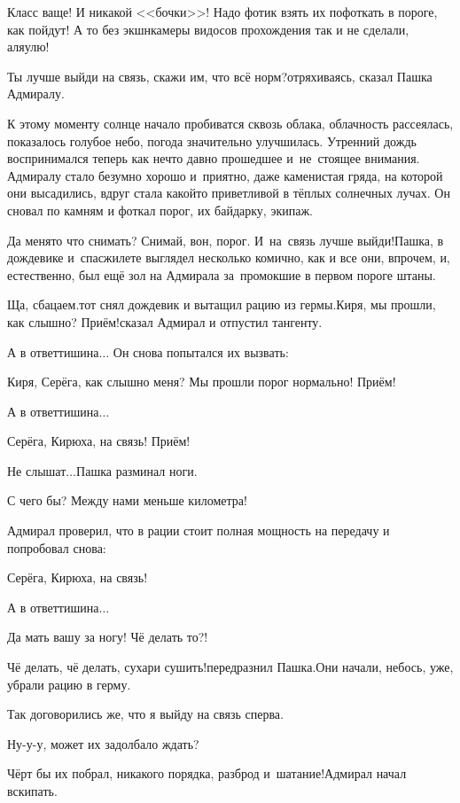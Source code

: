\diagdash Класс ваще! И никакой <<бочки>>! Надо фотик взять их пофоткать в пороге, как пойдут! А то без экшн\sdash камеры видосов прохождения так и не сделали, аля\sdash улю!

\diagdash Ты лучше выйди на связь, скажи им, что всё норм?\mdash отряхиваясь, сказал Пашка Адмиралу.

К этому моменту солнце начало пробиватся сквозь облака, облачность рассеялась, показалось голубое небо, погода значительно улучшилась. Утренний дождь воспринимался теперь как нечто давно прошедшее и~не~стоящее внимания. Адмиралу стало безумно хорошо и~приятно, даже каменистая гряда, на которой они высадились, вдруг стала какой\sdash то приветливой в тёплых солнечных лучах. Он сновал по камням и фоткал порог, их байдарку, экипаж.

\diagdash Да меня\sdash то что снимать? Снимай, вон, порог. И~на~связь лучше выйди!\mdash Пашка, в дождевике и~спасжилете выглядел несколько комично, как и все они, впрочем, и, естественно, был ещё зол на Адмирала за~промокшие в первом пороге штаны. 

\diagdash Ща, сбацаем.\mdash тот снял дождевик и вытащил рацию из гермы.\mdash Киря, мы прошли, как слышно? Приём!\mdash сказал Адмирал и отпустил тангенту.

А в ответ\mdash тишина$\ldots$ Он снова попытался их вызвать:

\diagdash Киря, Серёга, как слышно меня? Мы прошли порог нормально! Приём!

А в ответ\mdash тишина$\ldots$

\diagdash Серёга, Кирюха, на связь! Приём!

\diagdash Не слышат$\ldots$\mdash Пашка разминал ноги.

\diagdash С чего бы? Между нами меньше километра!

Адмирал проверил, что в рации стоит полная мощность на передачу и попробовал снова:

\diagdash Серёга, Кирюха, на связь!

А в ответ\mdash тишина$\ldots$

\diagdash Да мать вашу за ногу! Чё делать то?!

\diagdash Чё делать, чё делать, сухари сушить!\mdash передразнил Пашка.\mdash Они начали, небось, уже, убрали рацию в герму.

\diagdash Так договорились же, что я выйду на связь сперва.

\diagdash Ну-у-у, может их задолбало ждать?

\diagdash Чёрт бы их побрал, никакого порядка, разброд и~шатание!\mdash Адмирал начал вскипать.


